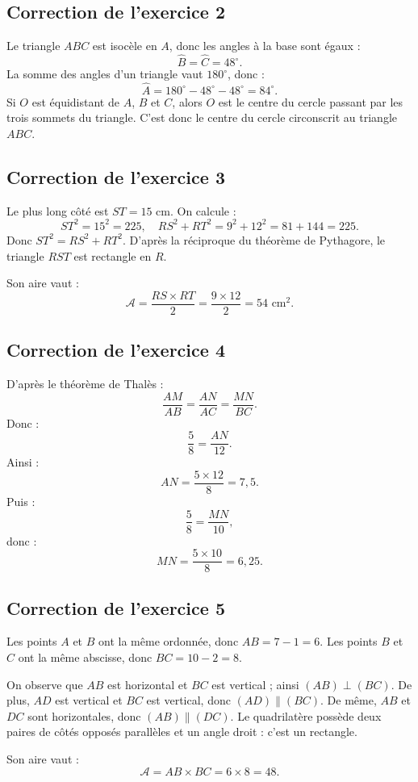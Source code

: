 \documentclass[11pt,a4paper]{article}
\newcounter{exercice}
\begin{document}
\subsection*{Correction de l'exercice 2}
Le triangle $ABC$ est isocèle en $A$, donc les angles à la base sont égaux :
\[
\widehat{B}=\widehat{C}=48^\circ.
\]
La somme des angles d'un triangle vaut $180^\circ$, donc :
\[
\widehat{A}=180^\circ-48^\circ-48^\circ=84^\circ.
\]
Si $O$ est équidistant de $A$, $B$ et $C$, alors $O$ est le centre du cercle passant par les trois sommets du triangle. C'est donc le centre du cercle circonscrit au triangle $ABC$.

\subsection*{Correction de l'exercice 3}
Le plus long côté est $ST=15$ cm. On calcule :
\[
ST^2=15^2=225,
\quad RS^2+RT^2=9^2+12^2=81+144=225.
\]
Donc $ST^2=RS^2+RT^2$. D'après la réciproque du théorème de Pythagore, le triangle $RST$ est rectangle en $R$.

Son aire vaut :
\[
\mathcal A=\frac{RS\times RT}{2}=\frac{9\times12}{2}=54\text{ cm}^2.
\]

\subsection*{Correction de l'exercice 4}
D'après le théorème de Thalès :
\[
\frac{AM}{AB}=\frac{AN}{AC}=\frac{MN}{BC}.
\]
Donc :
\[
\frac{5}{8}=\frac{AN}{12}.
\]
Ainsi :
\[
AN=\frac{5\times12}{8}=7,5.
\]
Puis :
\[
\frac{5}{8}=\frac{MN}{10},
\]
donc :
\[
MN=\frac{5\times10}{8}=6,25.
\]

\subsection*{Correction de l'exercice 5}
Les points $A$ et $B$ ont la même ordonnée, donc $AB=7-1=6$. Les points $B$ et $C$ ont la même abscisse, donc $BC=10-2=8$.

On observe que $AB$ est horizontal et $BC$ est vertical ; ainsi $(AB)\perp(BC)$. De plus, $AD$ est vertical et $BC$ est vertical, donc $(AD)\parallel(BC)$. De même, $AB$ et $DC$ sont horizontales, donc $(AB)\parallel(DC)$. Le quadrilatère possède deux paires de côtés opposés parallèles et un angle droit : c'est un rectangle.

Son aire vaut :
\[
\mathcal A=AB\times BC=6\times8=48.
\]

\clearpage
\end{document}
